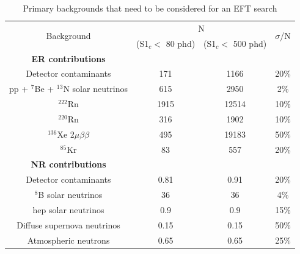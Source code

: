 \begin{table}[]
    \centering
    \begin{tabular}{c|c|c|c}
        \multirow{2}{*}{Background}                  & \multicolumn{2}{|c|}{N}                          & \multirow{2}{*}{$\sigma$/N}  \\ 
                                                     &  (S1$_c <$ 80 phd)     & (S1$_c <$ 500 phd)      &              \\ \hline
        \textbf{ER contributions}                    &                        &                         &   \\
        Detector contaminants                        & 171                    & 1166                    & 20\% \cite{LZ_projected_sensitivity_paper_ref}        \\
        pp + ${}^{7}$Be + ${}^{13}$N solar neutrinos & 615                    & 2950                    & 2\% \cite{pp_solar_neutrinos_rate_ref}       \\
        ${}^{222}$Rn                                 & 1915                   & 12514                   & 10\% \cite{lz_predicted_radon_rate_ref}        \\
        ${}^{220}$Rn                                 & 316                    & 1902                    & 10\% \cite{lz_predicted_radon_rate_ref}        \\
        ${}^{136}$Xe 2$\mu\beta\beta$                & 495                    & 19183                   & 50\% \cite{double_beta_decay_rate_ref}        \\
        ${}^{85}$Kr                                  & 83                     & 557                     & 20\% \cite{kr85_rate_ref}         \\ \hline
        \textbf{NR contributions}                    &                        &                         &   \\
        Detector contaminants                        & 0.81                   & 0.91                    & 20\% \cite{LZ_projected_sensitivity_paper_ref}         \\
        ${}^{8}$B solar neutrinos                    & 36                     & 36                      & 4\%  \cite{b8_neutrino_rate_ref}       \\
        hep solar neutrinos                          & 0.9                    & 0.9                     & 15\% \cite{pp_solar_neutrinos_rate_ref}        \\
        Diffuse supernova neutrinos                  & 0.15                   & 0.15                    & 50\% \cite{dissuse_supernova_neutrinos_rate_ref}        \\
        Atmospheric neutrons                         & 0.65                   & 0.65                    & 25\% \cite{atmospheric_neutrinos_rate_ref}      
    \end{tabular}
    \caption{Primary backgrounds that need to be considered for an EFT search}
    \label{tab:projected_lz_backgrounds}
\end{table}

